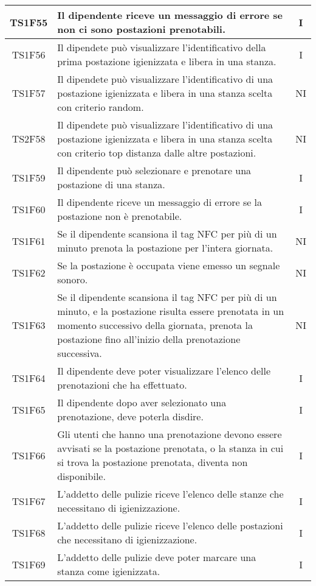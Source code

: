 \begin{center}
\begin{longtable}{|c|p{10cm}|c|}
			\hline
			TS1F55 & Il dipendente riceve un messaggio di errore se non ci sono postazioni prenotabili. & I \\	
			\hline
			TS1F56 & Il dipendete può visualizzare l'identificativo della prima postazione igienizzata e libera in una stanza. & I \\	
			\hline
			TS1F57 & Il dipendete può visualizzare l'identificativo di una postazione igienizzata e libera in una stanza scelta con criterio random. & NI \\	
			\hline
			TS2F58 & Il dipendete può visualizzare l'identificativo di una postazione igienizzata e libera in una stanza scelta con criterio top distanza dalle altre postazioni. & NI \\	
			\hline
			TS1F59 & Il dipendente può selezionare e prenotare una postazione di una stanza. & I \\		
			\hline
			TS1F60 & Il dipendente riceve un messaggio di errore se la postazione non è prenotabile. & I \\	
			\hline
			TS1F61 & Se il dipendente scansiona il tag NFC per più di un minuto prenota la postazione per l'intera giornata. & NI \\	
			\hline
			TS1F62 & Se la postazione è occupata viene emesso un segnale sonoro. & NI \\	
			\hline
			TS1F63 & Se il dipendente scansiona il tag NFC per più di un minuto, e la postazione risulta essere prenotata in un momento successivo della giornata, prenota la postazione fino all'inizio della prenotazione successiva. & NI \\	
			\hline
			TS1F64 & Il dipendente deve poter visualizzare l'elenco delle prenotazioni che ha effettuato. & I \\
			\hline
			TS1F65 & Il dipendente dopo aver selezionato una prenotazione, deve poterla disdire. & I \\	
			\hline
			TS1F66 & Gli utenti che hanno una prenotazione devono essere avvisati se la postazione prenotata, o la stanza in cui si trova la postazione prenotata, diventa non disponibile. & I \\	
			\hline
			TS1F67 & L'addetto delle pulizie riceve l'elenco delle stanze che necessitano di igienizzazione. & I \\	
			\hline
			TS1F68 & L'addetto delle pulizie riceve l'elenco delle postazioni che necessitano di igienizzazione. & I \\	
			\hline
			TS1F69 & L'addetto delle pulizie deve poter marcare una stanza come igienizzata. & I \\	

\end{longtable}
\end{center}
